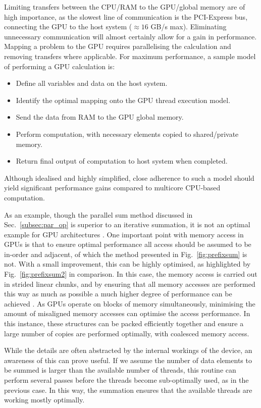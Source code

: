Limiting transfers between the CPU/RAM to the GPU/global memory are of high importance, as the slowest line of communication is the PCI-Express bus, connecting the GPU to the host system ($\approx 16 $ GB/s max). Eliminating unnecessary communication will almost certainly allow for a gain in performance. Mapping a problem to the GPU requires parallelising the calculation and removing transfers where applicable. For maximum performance, a sample model of performing a GPU calculation is:
\begin{itemize}
    \item Define all variables and data on the host system.
    \item Identify the optimal mapping onto the GPU thread execution model.
    \item Send the data from RAM to the GPU global memory.
    \item Perform computation, with necessary elements copied to shared/private memory.
    \item Return final output of computation to host system when completed.
\end{itemize}



Although idealised and highly simplified, close adherence to such a model should yield significant performance gains compared to multicore CPU-based computation.


As an example, though the parallel sum method discussed in Sec.~\ref{subsec:par_op} is superior to an iterative summation, it is not an optimal example for GPU architectures \cite{BK:Cuda_book}. One important point with memory access in GPUs is that to ensure optimal performance all access should be assumed to be in-order and adjacent, of which the method presented in Fig.~\ref{fig:prefixsum} is not. With a small improvement, this can be highly optimised, as highlighted by Fig.~\ref{fig:prefixsum2} in comparison. In this case, the memory access is carried out in strided linear chunks, and by ensuring that all memory accesses are performed this way as much as possible a much higher degree of performance can be achieved \cite{BK:Cuda_book}. As GPUs operate on blocks of memory simultaneously, minimising the amount of misaligned memory accesses can optimise the access performance. In this instance, these structures can be packed efficiently together and ensure a large number of copies are performed optimally, with coalesced memory access.

While the details are often abstracted by the internal workings of the device, an awareness of this can prove useful. If we assume the number of data elements to be summed is larger than the available number of threads, this routine can perform several passes before the threads become sub-optimally used, as in the previous case. In this way, the summation ensures that the available threads are working mostly optimally.

